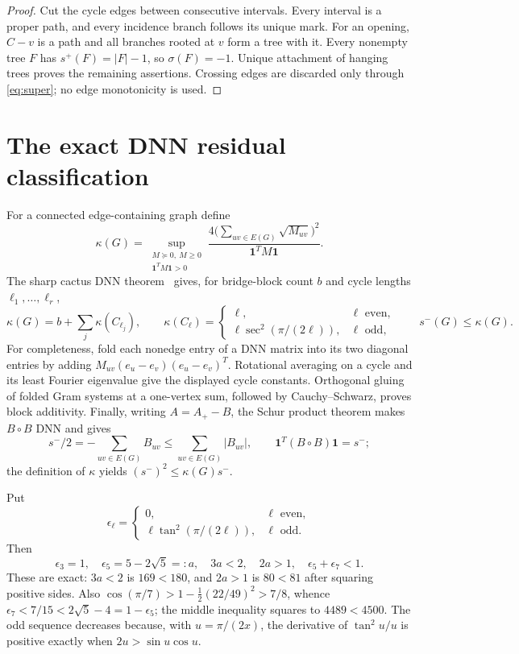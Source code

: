 \documentclass[11pt]{article}
\newcommand{\smE}{s^-}
\newcommand{\sig}{\sigma}
\newcommand{\one}{\mathbf 1}
\begin{document}
\begin{proof}
Cut the cycle edges between consecutive intervals.  Every interval is a proper
path, and every incidence branch follows its unique mark.  For an opening,
$C-v$ is a path and all branches rooted at $v$ form a tree with it.  Every
nonempty tree $F$ has $s^+(F)=|F|-1$, so $\sig(F)=-1$.  Unique attachment of
hanging trees proves the remaining assertions.  Crossing edges are discarded
only through \eqref{eq:super}; no edge monotonicity is used.
\end{proof}

\section{The exact DNN residual classification}

For a connected edge-containing graph define
\[
 \kappa(G)=\sup_{\substack{M\succeq0,\ M\geq0\\\one^TM\one>0}}
 \frac{4\bigl(\sum_{uv\in E(G)}\sqrt{M_{uv}}\bigr)^2}{\one^TM\one}.
\]
The sharp cactus DNN theorem~\cite{DNN,LTZ} gives, for bridge-block count $b$
and cycle lengths $\ell_1,\ldots,\ell_r$,
\begin{equation}\label{eq:kappa}
 \kappa(G)=b+\sum_j\kappa(C_{\ell_j}),\qquad
 \kappa(C_\ell)=
 \begin{cases}
  \ell,&\ell\text{ even},\\
  \ell\sec^2(\pi/(2\ell)),&\ell\text{ odd},
 \end{cases}
 \qquad \smE(G)\leq\kappa(G).
\end{equation}
For completeness, fold each nonedge entry of a DNN matrix into its two
diagonal entries by adding $M_{uv}(e_u-e_v)(e_u-e_v)^T$.  Rotational averaging
on a cycle and its least Fourier eigenvalue give the displayed cycle constants.
Orthogonal gluing of folded Gram systems at a one-vertex sum, followed by
Cauchy--Schwarz, proves block additivity.  Finally, writing $A=A_+-B$, the
Schur product theorem makes $B\circ B$ DNN and gives
\[
 \smE/2=-\sum_{uv\in E(G)}B_{uv}\leq\sum_{uv\in E(G)}|B_{uv}|,
 \qquad \one^T(B\circ B)\one=\smE;
\]
the definition of $\kappa$ yields $(\smE)^2\leq\kappa(G)\smE$.

Put
\[
 \epsilon_\ell=\begin{cases}0,&\ell\text{ even},\\
 \ell\tan^2(\pi/(2\ell)),&\ell\text{ odd}.
 \end{cases}
\]
Then
\begin{equation}\label{eq:epsilon}
 \epsilon_3=1,
 \quad \epsilon_5=5-2\sqrt5=:a,
 \quad 3a<2,
 \quad 2a>1,
 \quad \epsilon_5+\epsilon_7<1.
\end{equation}
These are exact: $3a<2$ is $169<180$, and $2a>1$ is $80<81$ after
squaring positive sides.  Also
$\cos(\pi/7)>1-\tfrac12(22/49)^2>7/8$, whence
$\epsilon_7<7/15<2\sqrt5-4=1-\epsilon_5$; the middle inequality squares to
$4489<4500$.  The odd sequence decreases because, with
$u=\pi/(2x)$, the derivative of $\tan^2u/u$ is positive exactly when
$2u>\sin u\cos u$.
\end{document}
